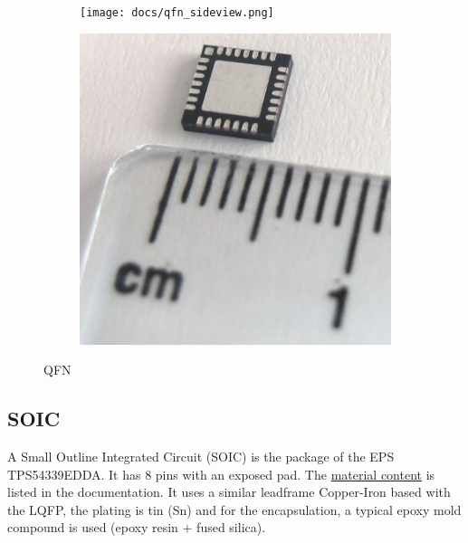 \documentclass[final]{cubedoc}
\begin{document}
	\begin{figure}[h!]
		\centering
		\begin{subfigure}{.5\textwidth}
			\centering
			\texttt{[image: docs/qfn\_sideview.png]}
			\caption{}
			\label{fig:sub1}
		\end{subfigure}%
		\begin{subfigure}{.5\textwidth}
			\centering
			\includegraphics[keepaspectratio, width=0.5\linewidth, height=.3\textheight]{docs/qfn_real.jpg}
			\caption{}
			\label{fig:sub2}
		\end{subfigure}
		\caption{QFN}
		\label{fig:test}
	\end{figure}
	
	\pagebreak
	
	
	
	
	
	
	
	
	
	
	
	
	\subsection{SOIC}
	
	A Small Outline Integrated Circuit (SOIC) is the package of the EPS TPS54339EDDA. It has 8 pins with an exposed pad. The  \href{https://web.archive.org/web/20200818133800/https://www.ti.com/materialcontent/en/report?pcid=263544&opn=TPS54339EDDA}{material content} is listed in the documentation. It uses a similar leadframe Copper-Iron based with the LQFP, the plating is tin (Sn) and for the encapsulation, a typical epoxy mold compound is used (epoxy resin + fused silica). 
	
\end{document}
